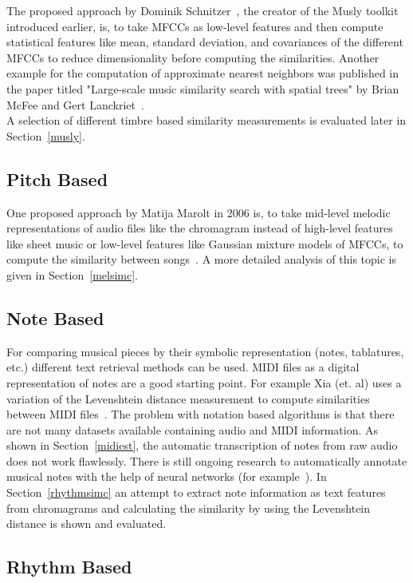 The proposed approach by Dominik Schnitzer~\cite{schnitzer1}, the creator of the Musly toolkit introduced earlier, is, to take MFCCs as low-level features and then compute statistical features like mean, standard deviation, and covariances of the different MFCCs to reduce dimensionality before computing the similarities. Another example for the computation of approximate nearest neighbors was published in the paper titled "Large-scale music similarity search with spatial trees" by Brian McFee and Gert Lanckriet~\cite{msd4}.\\ 
A selection of different timbre based similarity measurements is evaluated later in Section~\ref{musly}.

\subsection{Pitch Based}

One proposed approach by Matija Marolt in 2006 is, to take mid-level melodic representations of audio files like the chromagram instead of high-level features like sheet music or low-level features like Gaussian mixture models of MFCCs, to compute the similarity between songs~\cite{pitch1}. A more detailed analysis of this topic is given in Section~\ref{melsimc}.

\subsection{Note Based}

For comparing musical pieces by their symbolic representation (notes, tablatures, etc.) different text retrieval methods can be used. MIDI files as a digital representation of notes are a good starting point. For example Xia (et. al) uses a variation of the Levenshtein distance measurement to compute similarities between MIDI files~\cite{chroma4}. 
The problem with notation based algorithms is that there are not many datasets available containing audio and MIDI information. As shown in Section~\ref{midiest}, the automatic transcription of notes from raw audio does not work flawlessly. There is still ongoing research to automatically annotate musical notes with the help of neural networks (for example~\cite{crepe1}).
In Section~\ref{rhythmsimc} an attempt to extract note information as text features from chromagrams and calculating the similarity by using the Levenshtein distance is shown and evaluated.

\subsection{Rhythm Based}

